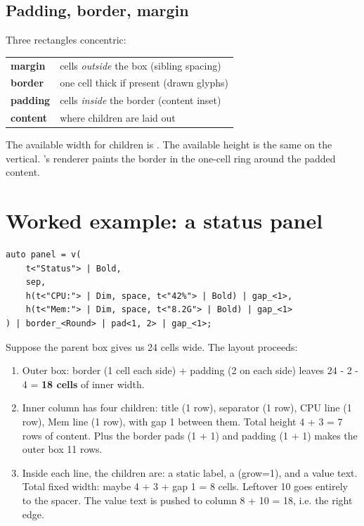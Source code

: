 \subsection{Padding, border, margin}

Three rectangles concentric:

\begin{center}
\small
\begin{tabular}{ll}
\textbf{margin} & cells \emph{outside} the box (sibling spacing) \\
\textbf{border} & one cell thick if present (drawn glyphs) \\
\textbf{padding} & cells \emph{inside} the border (content inset) \\
\textbf{content} & where children are laid out \\
\end{tabular}
\end{center}

The available width for children is . The available height is the same on the
vertical. \maya{}'s renderer paints the border in the one-cell ring
around the padded content.

\section{Worked example: a status panel}

\begin{lstlisting}
auto panel = v(
    t<"Status"> | Bold,
    sep,
    h(t<"CPU:"> | Dim, space, t<"42%"> | Bold) | gap_<1>,
    h(t<"Mem:"> | Dim, space, t<"8.2G"> | Bold) | gap_<1>
) | border_<Round> | pad<1, 2> | gap_<1>;
\end{lstlisting}

Suppose the parent box gives us 24 cells wide. The layout proceeds:

\begin{enumerate}[leftmargin=*]
  \item Outer box: border (1 cell each side) + padding (2 on each
    side) leaves 24 - 2 - 4 = \textbf{18 cells} of inner width.
  \item Inner column has four children: title (1 row), separator (1
    row), CPU line (1 row), Mem line (1 row), with gap 1 between
    them. Total height 4 + 3 = 7 rows of content. Plus the border
    pads (1 + 1) and padding (1 + 1) makes the outer box 11 rows.
  \item Inside each  line, the children are: a static
    label, a  (grow=1), and a value text. Total fixed
    width: maybe 4 + 3 + gap 1 = 8 cells. Leftover 10 goes entirely
    to the spacer. The value text is pushed to column 8 + 10 = 18,
    i.e. the right edge.
\end{enumerate}

